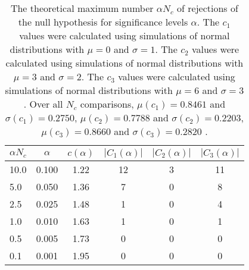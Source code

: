\begin{table}[h!]
\begin{center}
\begin{tabular}{| l | c | c | c | c | c |}\hline
$\alpha N_c$ & $\alpha$ & $c(\alpha)$ & $|C_1(\alpha)|$ & $|C_2(\alpha)|$ & $|C_3(\alpha)|$ \\\hline\hline
10.0 & 0.100 & 1.22 & 12 & 3 & 11 \\\hline
5.0 & 0.050 & 1.36 & 7 & 0 & 8 \\\hline
2.5 & 0.025 & 1.48 & 1 & 0 & 4 \\\hline
1.0 & 0.010 & 1.63 & 1 & 0 & 1 \\\hline
0.5 & 0.005 & 1.73 & 0 & 0 & 0 \\\hline
0.1 & 0.001 & 1.95 & 0 & 0 & 0 \\\hline
\end{tabular}
\caption{The theoretical maximum number $\alpha N_c$ of rejections
        of the null hypothesis for significance levels $\alpha$.
        The $c_1$ values were calculated using simulations of normal distributions with $\mu=0$ and $\sigma=1$.
        The $c_2$ values were calculated using simulations of normal distributions with $\mu=3$ and $\sigma=2$.
        The $c_3$ values were calculated using simulations of normal distributions with $\mu=6$ and $\sigma=3$.
        Over all $N_c$ comparisons,
         $\mu(c_1)=0.8461$ and $\sigma(c_1)=0.2750$,
         $\mu(c_2)=0.7788$ and $\sigma(c_2)=0.2203$,
         $\mu(c_3)=0.8660$ and $\sigma(c_3)=0.2820$ .
        }
\end{center}
\end{table}